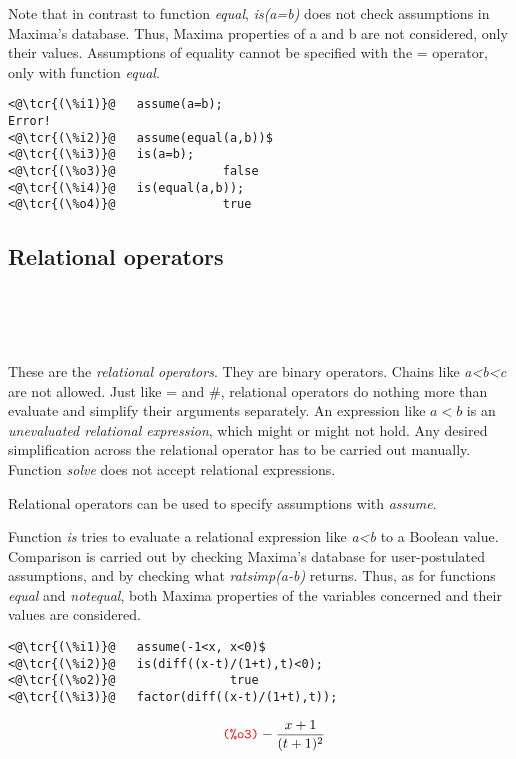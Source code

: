 \documentclass[../Maxima_Workbook.tex]{subfiles}
\begin{document}
\lz Note that in contrast to function \emph{equal}, \emph{is(a=b)} does not check assumptions in Maxima's database. Thus, Maxima properties of a and b are not considered, only their values. Assumptions of equality cannot be specified with the = operator, only with function \emph{equal}.

\lz \begin{lstlisting}
<@\tcr{(\%i1)}@   assume(a=b);	
Error!
<@\tcr{(\%i2)}@   assume(equal(a,b))$
<@\tcr{(\%i3)}@   is(a=b);
<@\tcr{(\%o3)}@			      false
<@\tcr{(\%i4)}@   is(equal(a,b));
<@\tcr{(\%o4)}@			      true
\end{lstlisting}

\subsection{Relational operators}

\lzz \tcr{\emph{<}} \hfill {}\index{<} \\
\tcr{\emph{>}} \hfill {}\index{>} \\
\tcr{\emph{<=}} \hfill {}\index{<=} \\
\lz \tcr{\emph{>=}} \hfill {}\index{>=}

\lz These are the \emph{relational operators}. They are binary operators. Chains like \emph{a<b<c} are not allowed. Just like = and \#, relational operators do nothing more than evaluate and simplify their arguments separately. An expression like $ a<b $ is an \emph{unevaluated relational expression}, which might or might not hold. Any desired simplification across the relational operator has to be carried out manually. Function \emph{solve} does not accept relational expressions. 

\lz Relational operators can be used to specify assumptions with \emph{assume}.

\lz Function \emph{is} tries to evaluate a relational expression like \emph{a<b} to a Boolean value. Comparison is carried out by checking Maxima's database for user-postulated assumptions, and by checking what \emph{ratsimp(a-b)} returns. Thus, as for functions \emph{equal} and \emph{notequal}, both Maxima properties of the variables concerned and their values are considered.

\lz \begin{small}
\color{blue} \leqn
\begin{lstlisting}
<@\tcr{(\%i1)}@   assume(-1<x, x<0)$	
<@\tcr{(\%i2)}@   is(diff((x-t)/(1+t),t)<0);
<@\tcr{(\%o2)}@			       true
<@\tcr{(\%i3)}@   factor(diff((x-t)/(1+t),t));
\end{lstlisting}
\vspace{-5mm} 	\[ \tag*{\tcr{\ttfamily (\%o3)}} -\frac{x+1}{(t+1)^2} \]
\color{black} \reqn
\end{small}
\end{document}
